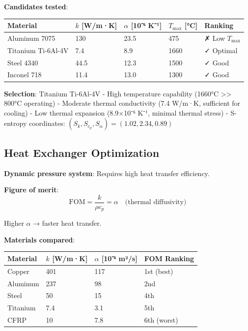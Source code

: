 \documentclass[12pt,a4paper]{article}
\begin{document}
\textbf{Candidates tested}:

\begin{center}
\begin{tabular}{|l|l|l|l|l|}
\hline
\textbf{Material} & \textbf{$k$ [W/m·K]} & \textbf{$\alpha$ [10⁻⁶ K⁻¹]} & \textbf{$T_{\text{max}}$ [°C]} & \textbf{Ranking} \\
\hline
Aluminum 7075 & 130 & 23.5 & 475 & ✗ Low $T_{\text{max}}$ \\
Titanium Ti-6Al-4V & 7.4 & 8.9 & 1660 & ✓ Optimal \\
Steel 4340 & 44.5 & 12.3 & 1500 & ✓ Good \\
Inconel 718 & 11.4 & 13.0 & 1300 & ✓ Good \\
\hline
\end{tabular}
\end{center}

\textbf{Selection}: Titanium Ti-6Al-4V
- High temperature capability (1660°C >> 800°C operating)
- Moderate thermal conductivity (7.4 W/m·K, sufficient for cooling)
- Low thermal expansion (8.9×10⁻⁶ K⁻¹, minimal thermal stress)
- S-entropy coordinates: $(S_k, S_{c_p}, S_{\alpha}) = (1.02, 2.34, 0.89)$

\subsection{Heat Exchanger Optimization}

\textbf{Dynamic pressure system}: Requires high heat transfer efficiency.

\textbf{Figure of merit}:
\begin{equation}
\text{FOM} = \frac{k}{\rho c_p} = \alpha \quad \text{(thermal diffusivity)}
\end{equation}

Higher $\alpha$ → faster heat transfer.

\textbf{Materials compared}:

\begin{center}
\begin{tabular}{|l|l|l|l|}
\hline
\textbf{Material} & \textbf{$k$ [W/m·K]} & \textbf{$\alpha$ [10⁻⁶ m²/s]} & \textbf{FOM Ranking} \\
\hline
Copper & 401 & 117 & 1st (best) \\
Aluminum & 237 & 98 & 2nd \\
Steel & 50 & 15 & 4th \\
Titanium & 7.4 & 3.1 & 5th \\
CFRP & 10 & 7.8 & 6th (worst) \\
\hline
\end{tabular}
\end{center}
\end{document}
